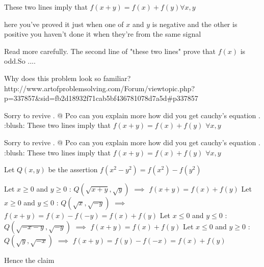 \begin{solution}
	\begin{tcolorbox}These two lines imply that $ f(x+y)=f(x)+f(y) \forall x,y $

here you've proved it just when one of $ x $ and $ y $ is negative and the other is positive
you haven't done it when they're from the same signal\end{tcolorbox}
Read more carefully. The second line of "these two lines" prove that $f(x)$ is odd.So ....
\end{solution}



\begin{solution}
	Why does this problem look so familiar? http://www.artofproblemsolving.com/Forum/viewtopic.php?p=337857&sid=fb2d18932f71cab5bf436781078d7a5d#p337857
\end{solution}



\begin{solution}
	Sorry to revive . @ Pco can you explain more how did you get cauchy's equation . :blush: 
These two lines imply that $ f(x+y)=f(x)+f(y)$ $ \forall x,y$


\end{solution}



\begin{solution}
	\begin{tcolorbox}Sorry to revive . @ Pco can you explain more how did you get cauchy's equation . :blush: 
These two lines imply that $ f(x+y)=f(x)+f(y)$ $ \forall x,y$\end{tcolorbox}

Let $Q(x,y)$ be the assertion $f(x^2-y^2)=f(x^2)-f(y^2)$

Let $x\ge 0$ and $y\ge 0$ : $Q(\sqrt{x+y},\sqrt y)$ $\implies$ $f(x+y)=f(x)+f(y)$
Let $x\ge 0$ and $y\le 0$ : $Q(\sqrt x,\sqrt{-y})$ $\implies$ $f(x+y)=f(x)-f(-y)=f(x)+f(y)$
Let $x\le 0$ and $y\le 0$ : $Q(\sqrt{-x-y},\sqrt {-y})$ $\implies$ $f(x+y)=f(x)+f(y)$
Let $x\le 0$ and $y\ge 0$ : $Q(\sqrt y,\sqrt{-x})$ $\implies$ $f(x+y)=f(y)-f(-x)=f(x)+f(y)$

Hence the claim

\end{solution}



